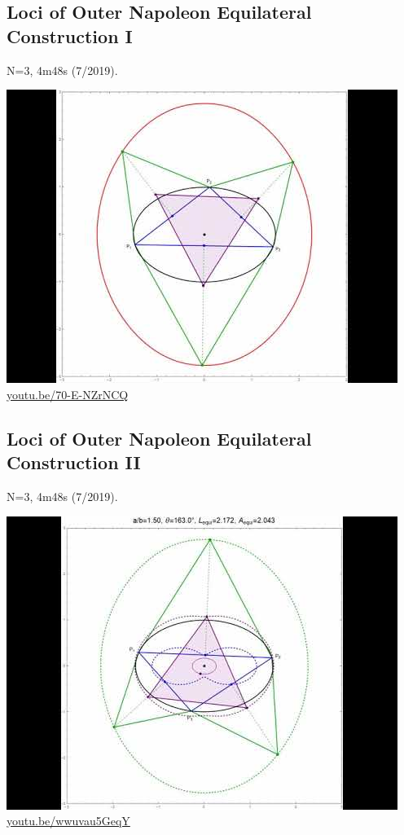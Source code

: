 \documentclass[12pt]{amsart}
\begin{document}
\subsection{Loci of Outer Napoleon Equilateral Construction I}
\label{vid:70-E-NZrNCQ}
\noindent N=3, 4m48s (7/2019). 
\begin{center}\includegraphics[width=.5\textwidth]{pics/70-E-NZrNCQ.jpg} \\ 
\href{https://youtu.be/70-E-NZrNCQ}{\url{youtu.be/70-E-NZrNCQ}}\end{center}
% 

\subsection{Loci of Outer Napoleon Equilateral Construction II}
\label{vid:wwuvau5GeqY}
\noindent N=3, 4m48s (7/2019). 
\begin{center}\includegraphics[width=.5\textwidth]{pics/wwuvau5GeqY.jpg} \\ 
\href{https://youtu.be/wwuvau5GeqY}{\url{youtu.be/wwuvau5GeqY}}\end{center}
% 
\end{document}
